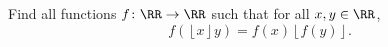 Find all functions $f \colon \RR \to \RR$ such that for all $x,y \in \RR$,
\[ f(\left\lfloor x\right\rfloor y) = f(x)\left\lfloor f(y)\right\rfloor. \]